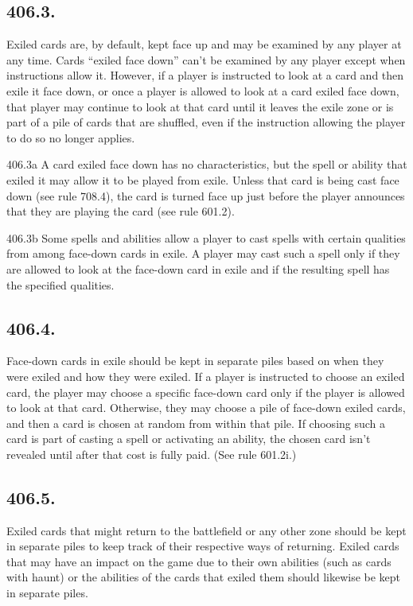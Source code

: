\subsection*{406.3.}
Exiled cards are, by default, kept face up and may be examined by any player at any time. Cards “exiled face down” can’t be examined by any player except when instructions allow it. However, if a player is instructed to look at a card and then exile it face down, or once a player is allowed to look at a card exiled face down, that player may continue to look at that card until it leaves the exile zone or is part of a pile of cards that are shuffled, even if the instruction allowing the player to do so no longer applies.

406.3a A card exiled face down has no characteristics, but the spell or ability that exiled it may allow it to be played from exile. Unless that card is being cast face down (see rule 708.4), the card is turned face up just before the player announces that they are playing the card (see rule 601.2).

406.3b Some spells and abilities allow a player to cast spells with certain qualities from among face-down cards in exile. A player may cast such a spell only if they are allowed to look at the face-down card in exile and if the resulting spell has the specified qualities.

\subsection*{406.4.}
Face-down cards in exile should be kept in separate piles based on when they were exiled and how they were exiled. If a player is instructed to choose an exiled card, the player may choose a specific face-down card only if the player is allowed to look at that card. Otherwise, they may choose a pile of face-down exiled cards, and then a card is chosen at random from within that pile. If choosing such a card is part of casting a spell or activating an ability, the chosen card isn’t revealed until after that cost is fully paid. (See rule 601.2i.)

\subsection*{406.5.}
Exiled cards that might return to the battlefield or any other zone should be kept in separate piles to keep track of their respective ways of returning. Exiled cards that may have an impact on the game due to their own abilities (such as cards with haunt) or the abilities of the cards that exiled them should likewise be kept in separate piles.

